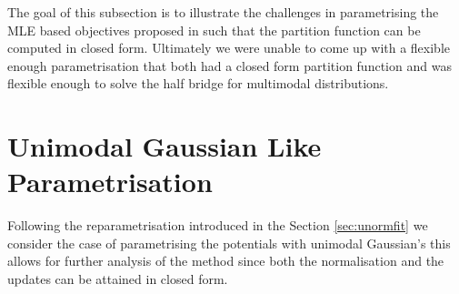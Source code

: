 \documentclass[a4paper,12pt,twoside,openright]{report}
\theoremstyle{definition}
\begin{document}
The goal of this subsection is to illustrate the challenges in parametrising the MLE based objectives proposed in \cite{pavon2018data} such that the partition function can be computed in closed form. Ultimately we were unable to come up with a flexible enough parametrisation that both had a closed form partition function and was flexible enough to solve the half bridge for multimodal distributions.

\section{Unimodal Gaussian Like Parametrisation}

Following the reparametrisation introduced in the Section \ref{sec:unormfit} we consider the case of parametrising the potentials with unimodal Gaussian's this allows for further analysis of the method since both the normalisation and the updates can be attained in closed form. 
\end{document}
